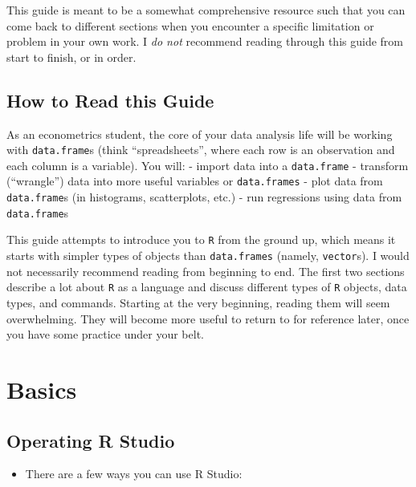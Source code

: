 \documentclass[]{book}
\providecommand{\tightlist}{%
  \setlength{\itemsep}{0pt}\setlength{\parskip}{0pt}}
\theoremstyle{definition}
\theoremstyle{definition}
\theoremstyle{definition}
\theoremstyle{remark}
\begin{document}
This guide is meant to be a somewhat comprehensive resource such that
you can come back to different sections when you encounter a specific
limitation or problem in your own work. I \emph{do not} recommend
reading through this guide from start to finish, or in order.

\section{How to Read this Guide}\label{how-to-read-this-guide}

As an econometrics student, the core of your data analysis life will be
working with \texttt{data.frame}s (think ``spreadsheets'', where each
row is an observation and each column is a variable). You will: - import
data into a \texttt{data.frame} - transform (``wrangle'') data into more
useful variables or \texttt{data.frames} - plot data from
\texttt{data.frame}s (in histograms, scatterplots, etc.) - run
regressions using data from \texttt{data.frame}s

This guide attempts to introduce you to \texttt{R} from the ground up,
which means it starts with simpler types of objects than
\texttt{data.frames} (namely, \texttt{vector}s). I would not necessarily
recommend reading from beginning to end. The first two sections describe
a lot about \texttt{R} as a language and discuss different types of
\texttt{R} objects, data types, and commands. Starting at the very
beginning, reading them will seem overwhelming. They will become more
useful to return to for reference later, once you have some practice
under your belt.

\chapter{Basics}\label{basics}

\section{Operating R Studio}\label{operating-r-studio}

\begin{itemize}
\tightlist
\item
  There are a few ways you can use R Studio:
\end{itemize}
\end{document}
